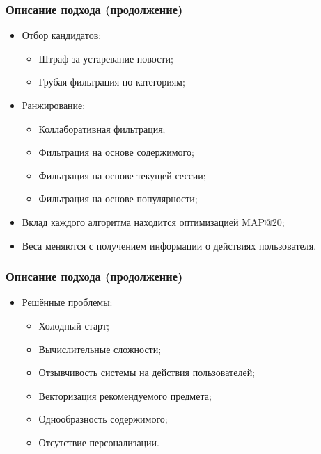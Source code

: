 \documentclass[xetex,mathserif,serif]{beamer}
\begin{document}
\begin{frame}
    \frametitle{Описание подхода (продолжение)}

	\begin{itemize}
        \item Отбор кандидатов:
            \begin{itemize}
                \item Штраф за устаревание новости;
                \item Грубая фильтрация по категориям;
            \end{itemize}
        \item Ранжирование:
            \begin{itemize}
                \item Коллаборативная фильтрация;
                \item Фильтрация на основе содержимого;
                \item Фильтрация на основе текущей сессии;
                \item Фильтрация на основе популярности;
            \end{itemize}
        \item Вклад каждого алгоритма находится оптимизацией MAP@20;
        \item Веса меняются с получением информации о действиях пользователя.
	\end{itemize}
\end{frame}

\begin{frame}
    \frametitle{Описание подхода (продолжение)}

	\begin{itemize}
        \item Решённые проблемы:
            \begin{itemize}
			    \item Холодный старт;
			    \item Вычислительные сложности;
                \item Отзывчивость системы на действия пользователей;
			    \item Векторизация рекомендуемого предмета;
			    \item Однообразность содержимого;
			    \item Отсутствие персонализации.
            \end{itemize}
	\end{itemize}
\end{frame}
\end{document}
